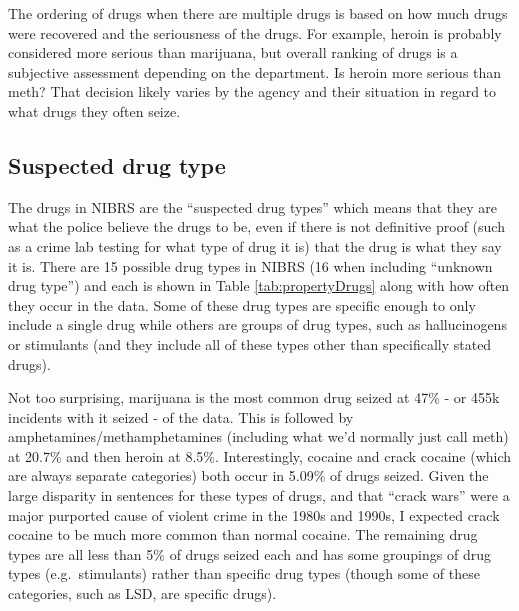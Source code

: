 \documentclass[
  12pt,
  openany]{book}
\begin{document}
The ordering of drugs when there are multiple drugs is based on how much drugs were recovered and the seriousness of the drugs. For example, heroin is probably considered more serious than marijuana, but overall ranking of drugs is a subjective assessment depending on the department. Is heroin more serious than meth? That decision likely varies by the agency and their situation in regard to what drugs they often seize.

\subsection{Suspected drug type}\label{suspected-drug-type}

The drugs in NIBRS are the ``suspected drug types'' which means that they are what the police believe the drugs to be, even if there is not definitive proof (such as a crime lab testing for what type of drug it is) that the drug is what they say it is. There are 15 possible drug types in NIBRS (16 when including ``unknown drug type'') and each is shown in Table \ref{tab:propertyDrugs} along with how often they occur in the data. Some of these drug types are specific enough to only include a single drug while others are groups of drug types, such as hallucinogens or stimulants (and they include all of these types other than specifically stated drugs).

Not too surprising, marijuana is the most common drug seized at 47\% - or 455k incidents with it seized - of the data. This is followed by amphetamines/methamphetamines (including what we'd normally just call meth) at 20.7\% and then heroin at 8.5\%. Interestingly, cocaine and crack cocaine (which are always separate categories) both occur in 5.09\% of drugs seized. Given the large disparity in sentences for these types of drugs, and that ``crack wars'' were a major purported cause of violent crime in the 1980s and 1990s, I expected crack cocaine to be much more common than normal cocaine. The remaining drug types are all less than 5\% of drugs seized each and has some groupings of drug types (e.g.~stimulants) rather than specific drug types (though some of these categories, such as LSD, are specific drugs).
\end{document}
